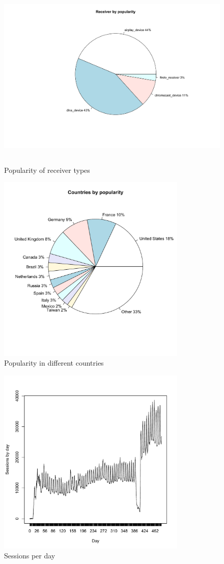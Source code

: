 \begin{figure}[htb]
\centering \includegraphics[height=9cm]{charts/receiver_popularity}
\caption{Popularity of receiver types \label{receiver_types}}
\end{figure}

\begin{figure}[htb]
\centering \includegraphics[height=9cm]{charts/country_popularity}
\caption{Popularity in different countries \label{user_country}}
\end{figure}


\begin{figure}[htb]
\centering \includegraphics[height=9cm]{charts/sessions_per_day}
\caption{Sessions per day \label{sessions_perday}}
\end{figure}

